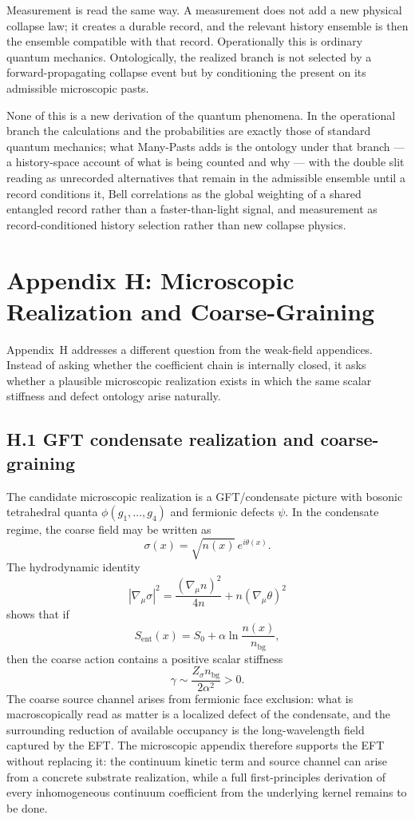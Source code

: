\documentclass[11pt]{article}
\begin{document}
Measurement is read the same way. A measurement does not add a new physical collapse law; it creates a durable record, and the relevant history ensemble is then the ensemble compatible with that record. Operationally this is ordinary quantum mechanics. Ontologically, the realized branch is not selected by a forward-propagating collapse event but by conditioning the present on its admissible microscopic pasts.

None of this is a new derivation of the quantum phenomena. In the operational branch the calculations and the probabilities are exactly those of standard quantum mechanics; what Many-Pasts adds is the ontology under that branch --- a history-space account of what is being counted and why --- with the double slit reading as unrecorded alternatives that remain in the admissible ensemble until a record conditions it, Bell correlations as the global weighting of a shared entangled record rather than a faster-than-light signal, and measurement as record-conditioned history selection rather than new collapse physics.

\section*{Appendix H: Microscopic Realization and Coarse-Graining}

Appendix~H addresses a different question from the weak-field appendices. Instead of asking whether the coefficient chain is internally closed, it asks whether a plausible microscopic realization exists in which the same scalar stiffness and defect ontology arise naturally.

\subsection*{H.1 GFT condensate realization and coarse-graining}

The candidate microscopic realization is a GFT/condensate picture with bosonic tetrahedral quanta $\phi(g_1,\ldots,g_4)$ and fermionic defects $\psi$. In the condensate regime, the coarse field may be written as
\[
\sigma(x)=\sqrt{n(x)}\,e^{i\theta(x)}.
\]
The hydrodynamic identity
\[
|\nabla_\mu \sigma|^2
=
\frac{(\nabla_\mu n)^2}{4n}
+n(\nabla_\mu\theta)^2
\]
shows that if
\[
S_{\mathrm{ent}}(x)=S_0+\alpha \ln\!\frac{n(x)}{n_{\mathrm{bg}}},
\]
then the coarse action contains a positive scalar stiffness
\[
\gamma \sim \frac{Z_\sigma n_{\mathrm{bg}}}{2\alpha^2}>0.
\]
The coarse source channel arises from fermionic face exclusion: what is macroscopically read as matter is a localized defect of the condensate, and the surrounding reduction of available occupancy is the long-wavelength field captured by the EFT. The microscopic appendix therefore supports the EFT without replacing it: the continuum kinetic term and source channel can arise from a concrete substrate realization, while a full first-principles derivation of every inhomogeneous continuum coefficient from the underlying kernel remains to be done.
\end{document}
